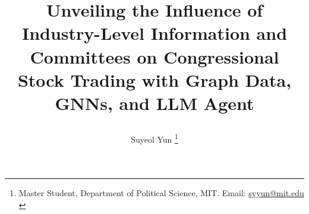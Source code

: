 \documentclass[15pt,letterpaper]{article}
\newcommand{\tit}{
\Large \bf
Unveiling the Influence of Industry-Level Information and Committees on Congressional Stock Trading with Graph Data, GNNs, and LLM Agent
}
\newcommand\spacingset[1]{\renewcommand{\baselinestretch}
{#1}\small\normalsize}
\begin{document}
\spacingset{1.25}

\setcounter{page}{0}
\vspace{-.1in}

{\title{
    \tit
  }
  \author{
    Suyeol Yun
  \thanks{Master Student, Department of Political Science, MIT. Email: \href{mailto:syyun@mit.edu}{syyun@mit.edu}\\
  }
  }
  \maketitle
}

\thispagestyle{empty}
\vspace{-.1in}
\end{document}
